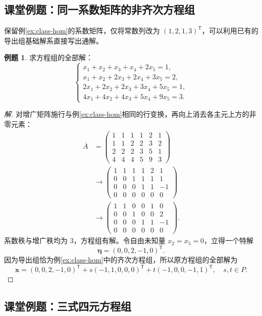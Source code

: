 \documentclass[UTF8, fontset=fandol, a4paper, 12pt]{ctexart}
\newcommand{\vx}{\boldsymbol{x}}
\newcommand{\veta}{\boldsymbol{\eta}}
\theoremstyle{definition}
\newtheorem{example}[definition]{例题}
\begin{document}
\subsection{课堂例题：同一系数矩阵的非齐次方程组}

保留例\ref{ex:class-hom}的系数矩阵，仅将常数列改为 $(1,2,1,3)^{\mathsf T}$，可以利用已有的导出组基础解系直接写出通解。

\begin{example}
求方程组的全部解：
\[
 \begin{cases}
 x_1+x_2+x_3+x_4+2x_5=1,\\
 x_1+x_2+2x_3+2x_4+3x_5=2,\\
 2x_1+2x_2+2x_3+3x_4+5x_5=1,\\
 4x_1+4x_2+4x_3+5x_4+9x_5=3.
 \end{cases}
\]
\end{example}
\begin{proof}[解]
对增广矩阵施行与例\ref{ex:class-hom}相同的行变换，再向上消去各主元上方的非零元素：
\begin{align*}
 \overline A
 &=\left(\begin{array}{rrrrr|r}1&1&1&1&2&1\\1&1&2&2&3&2\\2&2&2&3&5&1\\4&4&4&5&9&3\end{array}\right)\\
 &\longrightarrow
 \left(\begin{array}{rrrrr|r}1&1&1&1&2&1\\0&0&1&1&1&1\\0&0&0&1&1&-1\\0&0&0&0&0&0\end{array}\right)\\
 &\longrightarrow
 \left(\begin{array}{rrrrr|r}1&1&0&0&1&0\\0&0&1&0&0&2\\0&0&0&1&1&-1\\0&0&0&0&0&0\end{array}\right).
\end{align*}
系数秩与增广秩均为 $3$，方程组有解。令自由未知量 $x_2=x_5=0$，立得一个特解
\[
 \veta=(0,0,2,-1,0)^{\mathsf T}.
\]
因为导出组恰为例\ref{ex:class-hom}中的齐次方程组，所以原方程组的全部解为
\[
 \boxed{\vx=(0,0,2,-1,0)^{\mathsf T}
 +s(-1,1,0,0,0)^{\mathsf T}
 +t(-1,0,0,-1,1)^{\mathsf T},\quad s,t\in P.}
\]
\end{proof}

\subsection{课堂例题：三式四元方程组}
\end{document}
